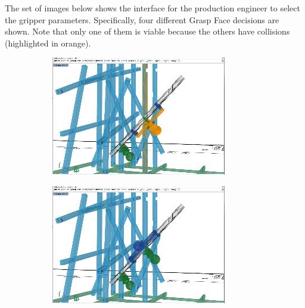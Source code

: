 \documentclass[11pt]{book}
\begin{document}
The set of images below shows the interface for the production engineer to select the gripper parameters. Specifically, four different Grasp Face decisions are shown. Note that only one of them is viable because the others have collisions (highlighted in orange). 

\begin{figure}[H]
\centering
\begin{subfigure}[b]{0.23\textwidth}
\centering
\includegraphics[width=\textwidth]{./images/image26.jpeg}
\end{subfigure}
\hfill
\begin{subfigure}[b]{0.23\textwidth}
\centering
\includegraphics[width=\textwidth]{./images/image27.jpeg}
\end{subfigure}
\hfill
\begin{subfigure}[b]{0.23\textwidth}
\centering

\end{subfigure}
\end{figure}
\end{document}
